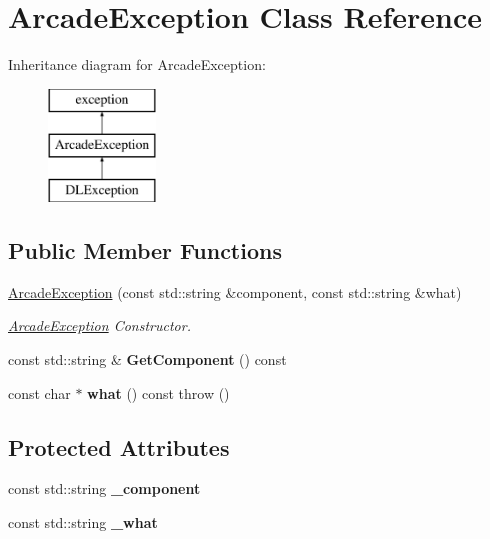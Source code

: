 \hypertarget{class_arcade_exception}{}\section{Arcade\+Exception Class Reference}
\label{class_arcade_exception}
Inheritance diagram for Arcade\+Exception\+:\begin{figure}[H]
\begin{center}
\leavevmode
\includegraphics[height=3.000000cm]{class_arcade_exception}
\end{center}
\end{figure}
\subsection*{Public Member Functions}
\begin{DoxyCompactItemize}
\item 
\hyperlink{class_arcade_exception_ad7e357368a060f8becc46f68db639951}{Arcade\+Exception} (const std\+::string \&component, const std\+::string \&what)
\begin{DoxyCompactList}\small\item\em \hyperlink{class_arcade_exception}{Arcade\+Exception} Constructor. \end{DoxyCompactList}\item 
\mbox{\label{class_arcade_exception_abbe1e647d775c7f8e3a4daba217b3514}} 
const std\+::string \& {\bfseries Get\+Component} () const
\item 
\mbox{\label{class_arcade_exception_ae8045bc16a31a859c210afea74de0797}} 
const char $\ast$ {\bfseries what} () const  throw ()
\end{DoxyCompactItemize}
\subsection*{Protected Attributes}
\begin{DoxyCompactItemize}
\item 
\mbox{\label{class_arcade_exception_a3a5f7687d6090d2bbf7bb3d0421dbfe8}} 
const std\+::string {\bfseries \+\_\+component}
\item 
\mbox{\label{class_arcade_exception_a499d9d1437e902595e5146c10c98dc4e}} 
const std\+::string {\bfseries \+\_\+what}
\end{DoxyCompactItemize}


